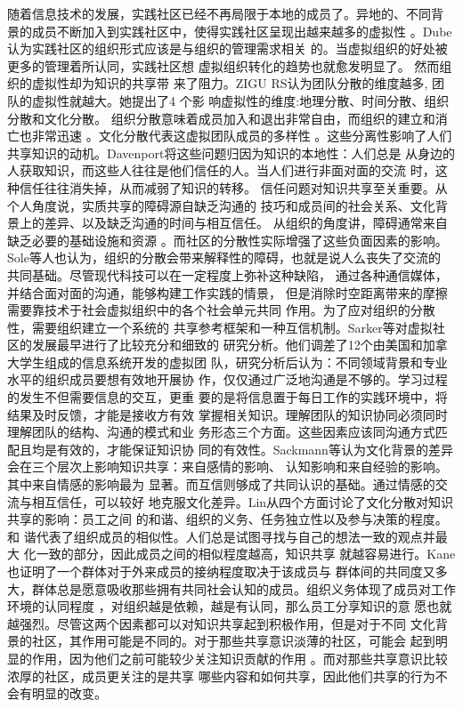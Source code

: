\documentclass[12pt,a4paper]{ctexart}
\begin{document}
随着信息技术的发展，实践社区已经不再局限于本地的成员了。异地的、不同背
景的成员不断加入到实践社区中，使得实践社区呈现出越来越多的虚拟性
\cite{preece2004eea}。Dube认为实践社区的组织形式应该是与组织的管理需求相关
的\cite{dube2006ttv}。当虚拟组织的好处被更多的管理着所认同，实践社区想
虚拟组织转化的趋势也就愈发明显了。  然而组织的虚拟性却为知识的共享带
来了阻力。ZIGU RS认为团队分散的维度越多, 团队的虚拟性就越大。她提出了4 个影
响虚拟性的维度:地理分散、时间分散、组织分散和文化分散\cite{ZIGURS2003}。
组织分散意味着成员加入和退出非常自由，而组织的建立和消亡也非常迅速
\cite{655269}。文化分散代表这虚拟团队成员的多样性
\cite{huangyouliandliutuanjie}。这些分离性影响了人们共享知识的动机。Davenport将这些问题归因为知识的本地性：人们总是
从身边的人获取知识，而这些人往往是他们信任的人。当人们进行非面对面的交流
时，这种信任往往消失掉，从而减弱了知识的转移\cite{davenport1998wko}。
信任问题对知识共享至关重要。从个人角度说，实质共享的障碍源自缺乏沟通的
技巧和成员间的社会关系、文化背景上的差异、以及缺乏沟通的时间与相互信任。
从组织的角度讲，障碍通常来自缺乏必要的基础设施和资源
\cite{riege2005tdk}。而社区的分散性实际增强了这些负面因素的影响。
Sole等人也认为，组织的分散会带来解释性的障碍，也就是说人么丧失了交流的
共同基础\cite{sole2000bkg}。尽管现代科技可以在一定程度上弥补这种缺陷，
通过各种通信媒体，并结合面对面的沟通，能够构建工作实践的情景\cite{robey2000slc}，
但是消除时空距离带来的摩擦需要靠技术于社会虚拟组织中的各个社会单元共同
作用\cite{sarker2004isa}。为了应对组织的分散性，需要组织建立一个系统的
共享参考框架和一种互信机制。Sarker等\cite{sarker2000uvt}对虚拟社区的发展最早进行了比较充分和细致的
研究分析。他们调差了12个由美国和加拿大学生组成的信息系统开发的虚拟团
队，研究分析后认为：不同领域背景和专业水平的组织成员要想有效地开展协
作，仅仅通过广泛地沟通是不够的。学习过程的发生不但需要信息的交互，更重
要的是将信息置于每日工作的实践环境中，将结果及时反馈，才能是接收方有效
掌握相关知识。理解团队的知识协同必须同时理解团队的结构、沟通的模式和业
务形态三个方面。这些因素应该同沟通方式匹配且均是有效的，才能保证知识协
同的有效性。Sackmann等认为文化背景的差异会在三个层次上影响知识共享：来自感情的影响、
认知影响和来自经验的影响\cite{sackmann2007eci}。其中来自情感的影响最为
显著。而互信则够成了共同认识的基础。通过情感的交流与相互信任，可以较好
地克服文化差异。Lin从四个方面讨论了文化分散对知识共享的影响：员工之间
的和谐、组织的义务、任务独立性以及参与决策的程度\cite{lin2007son}。和
谐代表了组织成员的相似性。人们总是试图寻找与自己的想法一致的观点并最大
化一致的部分\cite{vianen2000pof}，因此成员之间的相似程度越高，知识共享
就越容易进行。Kane也证明了一个群体对于外来成员的接纳程度取决于该成员与
群体间的共同度又多大，群体总是愿意吸收那些拥有共同社会认知的成员\cite{Kanea2005}。组织义务体现了成员对工作环境的认同程度
\cite{testa2001ocj}，对组织越是依赖，越是有认同，那么员工分享知识的意
愿也就越强烈。尽管这两个因素都可以对知识共享起到积极作用，但是对于不同
文化背景的社区，其作用可能是不同的。对于那些共享意识淡薄的社区，可能会
起到明显的作用，因为他们之前可能较少关注知识贡献的作用
\cite{witt2001iep}。而对那些共享意识比较浓厚的社区，成员更关注的是共享
哪些内容和如何共享，因此他们共享的行为不会有明显的改变\cite{eisenberger2001rpo}。
\end{document}

